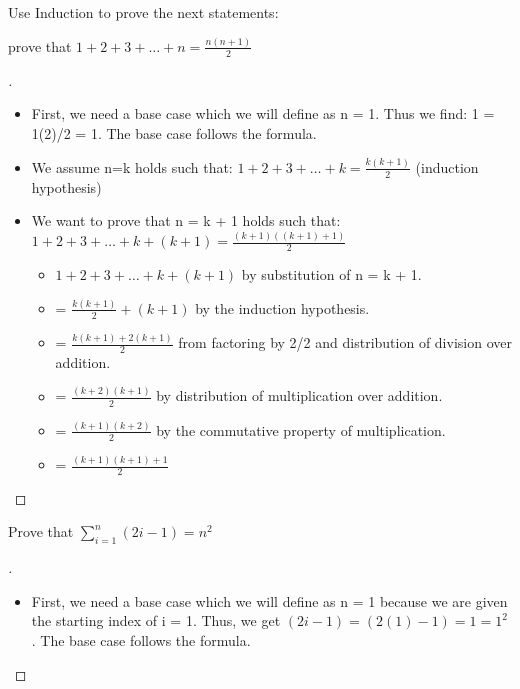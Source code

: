 \documentclass[12pt]{article}
\newenvironment{exercise}[2][Exercise]{\begin{trivlist}
\item[\hskip \labelsep {\bfseries #1}\hskip \labelsep {\bfseries #2.}]}{\end{trivlist}}
\newenvironment{solution}[1][{\color{red} Solution:}]{\begin{trivlist}
\item[\hskip \labelsep {\bfseries #1}\hskip \labelsep {\bfseries}]}{\end{trivlist}}
\begin{document}
\begin{exercise}{4} Use Induction to prove the next statements:

\begin{enumerate}[(a)]
	\item prove that $1 + 2 + 3 + \dots + n = \frac{n(n+1)}{2}$
    \begin{solution} 
        \begin{proof}[\unskip\nopunct]
         \ \\
            \begin{itemize}
               \item First, we need a base case which we will define as n = 1. Thus we find: 1 = 1(2)/2 = 1. The base case follows the formula.
                \item We assume n=k holds such that:  $1 + 2 + 3 + \dots + k = \frac{k(k+1)}{2}$ (induction hypothesis)
                \item We want to prove that n = k + 1 holds such that: $1 + 2 + 3 + \dots + k + (k+1)= \frac{(k+1)((k+1) + 1)}{2}$
                    \begin{itemize} [label=]
                        \item $1 + 2 + 3 + \dots + k + (k+1)$ by substitution of n = k + 1. 
                        \item = $\frac{k(k+1)}{2} + (k+1)$ by the induction hypothesis.
                        \item = $\frac{k(k+1) + 2(k+1)}{2} $ from factoring by 2/2 and distribution of division over addition. 
                        \item = $\frac{(k+2)(k+1)}{2}$ by distribution of multiplication over addition. 
                        \item = $\frac{(k+1)(k+2)}{2}$ by the commutative property of multiplication. 
                        \item = $\frac{(k+1)(k+1) + 1}{2}$
                    \end{itemize}
            \end{itemize}
        \end{proof}
    \end{solution}

\item  Prove that $\sum^{n}_{i=1}(2i - 1) = n^2$


\begin{solution} 
        \begin{proof}[\unskip\nopunct]
        \ \\
        \begin{itemize}
               \item First, we need a base case which we will define as n = 1 because we are given the starting index of i = 1. Thus, we get $(2i-1) = (2(1)-1) = 1 = 1^2$ . The base case follows the formula.


\end{itemize}
\end{proof}
\end{solution}
\end{enumerate}
\end{exercise}
\end{document}

